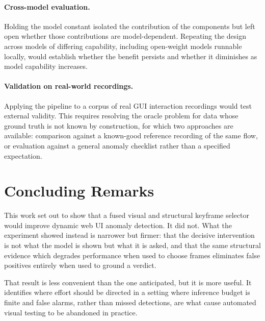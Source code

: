 \paragraph{Cross-model evaluation.}
Holding the model constant isolated the contribution of the components but
left open whether those contributions are model-dependent. Repeating the
design across models of differing capability, including open-weight models
runnable locally, would establish whether the benefit persists and whether
it diminishes as model capability increases.

\paragraph{Validation on real-world recordings.}
Applying the pipeline to a corpus of real GUI interaction recordings would
test external validity. This requires resolving the oracle problem for
data whose ground truth is not known by construction, for which two
approaches are available: comparison against a known-good reference
recording of the same flow, or evaluation against a general anomaly
checklist rather than a specified expectation.


\section{Concluding Remarks}
\label{sec:concluding}

This work set out to show that a fused visual and structural keyframe
selector would improve dynamic web UI anomaly detection. It did not. What
the experiment showed instead is narrower but firmer: that the decisive
intervention is not what the model is shown but what it is asked, and that
the same structural evidence which degrades performance when used to
choose frames eliminates false positives entirely when used to ground a
verdict.

That result is less convenient than the one anticipated, but it is more
useful. It identifies where effort should be directed in a setting where
inference budget is finite and false alarms, rather than missed detections,
are what cause automated visual testing to be abandoned in practice.
